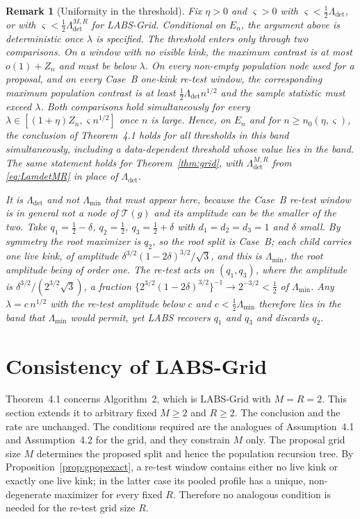 \documentclass[12pt, a4paper]{article}
\newtheorem{remark}{Remark}[section]
\newcommand{\mainthm}{Theorem~4.1}
\newcommand{\assterm}{Assumption~4.1}
\newcommand{\assnondeg}{Assumption~4.2}
\newcommand{\algmain}{Algorithm~2}
\begin{document}
\begin{remark}[Uniformity in the threshold]
\label{rem:uniformlam}
Fix $\eta>0$ and $\varsigma>0$ with
$\varsigma<\tfrac12\Lambda_{\mathrm{det}}$, or with
$\varsigma<\tfrac12\Lambda^{M,R}_{\mathrm{det}}$ for LABS-Grid. Conditional
on $E_n$, the argument above is deterministic once $\lambda$ is specified.
The threshold enters only through two comparisons. On a window with no visible
kink, the maximum contrast is at most $o(1)+Z_n$ and must be below $\lambda$.
On every non-empty population node used for a proposal, and on every Case~B
one-kink re-test window, the corresponding maximum population contrast is at
least $\tfrac12\Lambda_{\mathrm{det}}n^{1/2}$ and the sample statistic must
exceed $\lambda$. Both comparisons hold simultaneously for every
$\lambda\in[(1+\eta)Z_n,\varsigma n^{1/2}]$ once $n$ is large. Hence, on
$E_n$ and for $n\ge n_0(\eta,\varsigma)$, the conclusion of \mainthm{} holds
for all thresholds in this band simultaneously, including a data-dependent
threshold whose value lies in the band. The same statement holds for
Theorem~\ref{thm:grid}, with $\Lambda^{M,R}_{\mathrm{det}}$ from
\eqref{eq:LamdetMR} in place of $\Lambda_{\mathrm{det}}$.

It is $\Lambda_{\mathrm{det}}$ and not $\Lambda_{\min}$ that must appear here, because the Case~B re-test window is in general not a node of $\mathcal{T}(g)$ and its amplitude can be the smaller of the two. Take $q_1 = \tfrac12-\delta$, $q_2 = \tfrac12$, $q_3 = \tfrac12+\delta$ with $d_1=d_2=d_3=1$ and $\delta$ small. By symmetry the root maximizer is $q_2$, so the root split is Case~B; each child carries one live kink, of amplitude $\delta^{3/2}(1-2\delta)^{3/2}/\sqrt3$, and this is $\Lambda_{\min}$, the root amplitude being of order one. The re-test acts on $(q_1,q_3)$, where the amplitude is $\delta^{3/2}/(2^{3/2}\sqrt3)$, a fraction $\{2^{3/2}(1-2\delta)^{3/2}\}^{-1} \to 2^{-3/2} < \tfrac12$ of $\Lambda_{\min}$.  Any $\lambda = c\,n^{1/2}$ with the re-test amplitude below $c$ and $c < \tfrac12\Lambda_{\min}$ therefore lies in the band that $\Lambda_{\min}$ would permit, yet LABS recovers $q_1$ and $q_3$ and discards $q_2$.
\end{remark}



\section{Consistency of LABS-Grid}
\label{sup:gridtheory}

\mainthm{} concerns \algmain{}, which is LABS-Grid with $M = R = 2$. This section
extends it to arbitrary fixed $M \ge 2$ and $R \ge 2$. The conclusion and the
rate are unchanged. The conditions required are the analogues of \assterm{}
and \assnondeg{} for the grid, and they constrain $M$ only. The proposal grid
size $M$ determines the proposed split and hence the population recursion
tree. By Proposition~\ref{prop:gpopexact}, a re-test window contains either no
live kink or exactly one live kink; in the latter case its pooled profile has
a unique, non-degenerate maximizer for every fixed $R$. Therefore no analogous
condition is needed for the re-test grid size $R$.
\end{document}
